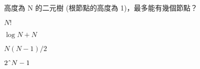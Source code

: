 \ifx\ntpcNinetyTwo\undefined[92學年基北區] \fi
高度為 N 的二元樹 (根節點的高度為 1)，最多能有幾個節點？
  \begin{optionlist}
  \item $N!$
  \item $\log{N}+N$
  \item $N(N-1)/2$
  \item $2\char`\^N-1$\label{ntpc-92-a24}
  \end{optionlist}